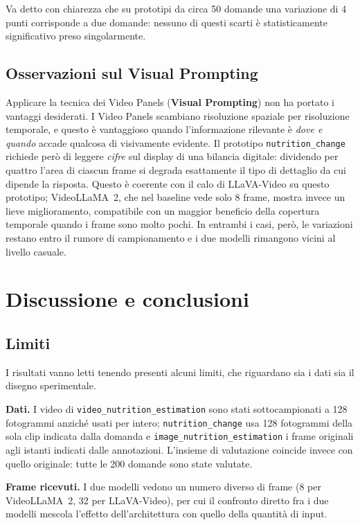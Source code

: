 \documentclass{article}
\begin{document}
Va detto con chiarezza che su prototipi da circa 50 domande una variazione di 4
punti corrisponde a due domande: nessuno di questi scarti è statisticamente
significativo preso singolarmente.

\subsection{Osservazioni sul Visual Prompting}

Applicare la tecnica dei Video Panels (\textbf{Visual Prompting}) non ha portato i vantaggi desiderati. I Video Panels scambiano risoluzione spaziale per risoluzione
temporale, e questo è vantaggioso quando l'informazione rilevante è
\emph{dove e quando} accade qualcosa di visivamente evidente. Il prototipo
\texttt{nutrition\_change} richiede però di leggere \emph{cifre} sul display di
una bilancia digitale: dividendo per quattro l'area di ciascun frame si
degrada esattamente il tipo di dettaglio da cui dipende la risposta. Questo è
coerente con il calo di LLaVA-Video su questo prototipo; VideoLLaMA~2, che nel
baseline vede solo 8 frame, mostra invece un lieve miglioramento, compatibile con
un maggior beneficio della copertura temporale quando i frame sono molto pochi.
In entrambi i casi, però, le variazioni restano entro il rumore di campionamento
e i due modelli rimangono vicini al livello casuale.

\section{Discussione e conclusioni}

\subsection{Limiti}

I risultati vanno letti tenendo presenti alcuni limiti, che riguardano sia i dati
sia il disegno sperimentale.

\textbf{Dati.} I video di \texttt{video\_nutrition\_estimation} sono stati
sottocampionati a 128 fotogrammi anziché usati per intero;
\texttt{nutrition\_change} usa 128 fotogrammi della sola clip indicata dalla
domanda e \texttt{image\_nutrition\_estimation} i frame originali agli istanti
indicati dalle annotazioni. L'insieme di valutazione coincide invece con quello
originale: tutte le 200 domande sono state valutate.

\textbf{Frame ricevuti.} I due modelli vedono un numero diverso di frame (8 per
VideoLLaMA~2, 32 per LLaVA-Video), per cui il confronto diretto fra i due
modelli mescola l'effetto dell'architettura con quello della quantità di input.
\end{document}
